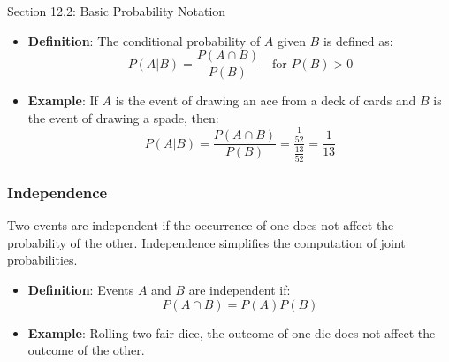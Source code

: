 \begin{notes}{Section 12.2: Basic Probability Notation}
    \begin{highlight}
    
        \begin{itemize}
            \item \textbf{Definition}: The conditional probability of $A$ given $B$ is defined as:
            \[
            P(A | B) = \frac{P(A \cap B)}{P(B)} \quad \text{for } P(B) > 0
            \]
            \item \textbf{Example}: If $A$ is the event of drawing an ace from a deck of cards and $B$ is the event of drawing a spade, then:
            \[
            P(A | B) = \frac{P(A \cap B)}{P(B)} = \frac{\frac{1}{52}}{\frac{13}{52}} = \frac{1}{13}
            \]
        \end{itemize}
    
    \end{highlight}
    
    \subsubsection*{Independence}
    
    Two events are independent if the occurrence of one does not affect the probability of the other. Independence simplifies the computation of joint probabilities.
    
    \begin{highlight}[Independence]
    
        \begin{itemize}
            \item \textbf{Definition}: Events $A$ and $B$ are independent if:
            \[
            P(A \cap B) = P(A)P(B)
            \]
            \item \textbf{Example}: Rolling two fair dice, the outcome of one die does not affect the outcome of the other.
        \end{itemize}
    
    \end{highlight}
    
    \begin{highlight}
    

\end{highlight}
\end{notes}
